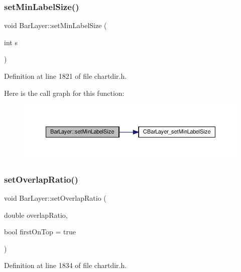 \subsubsection{\texorpdfstring{set\+Min\+Label\+Size()}{setMinLabelSize()}}
{\footnotesize\ttfamily void Bar\+Layer\+::set\+Min\+Label\+Size (\begin{DoxyParamCaption}\item[{int}]{s }\end{DoxyParamCaption})\hspace{0.3cm}{\ttfamily [inline]}}



Definition at line 1821 of file chartdir.\+h.

Here is the call graph for this function\+:
\nopagebreak
\begin{figure}[H]
\begin{center}
\leavevmode
\includegraphics[width=350pt]{class_bar_layer_a599f8b5e967c9f33662f1e9a89f7d2b4_cgraph}
\end{center}
\end{figure}
\mbox{\label{class_bar_layer_a422e4989ff347c49c30bc886ff87dbf4}} 
\subsubsection{\texorpdfstring{set\+Overlap\+Ratio()}{setOverlapRatio()}}
{\footnotesize\ttfamily void Bar\+Layer\+::set\+Overlap\+Ratio (\begin{DoxyParamCaption}\item[{double}]{overlap\+Ratio,  }\item[{bool}]{first\+On\+Top = {\ttfamily true} }\end{DoxyParamCaption})\hspace{0.3cm}{\ttfamily [inline]}}



Definition at line 1834 of file chartdir.\+h.

